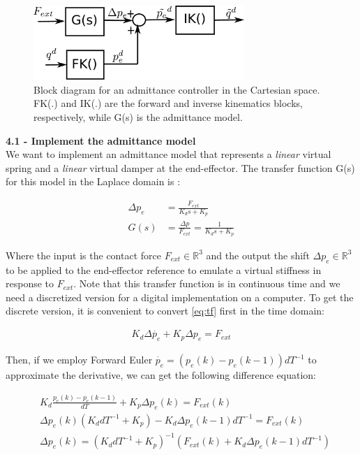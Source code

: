 \documentclass[11pt]{article}
\newcommand{\Rnum}{\mathbb{R}} %
\begin{document}
\begin{figure}[bht]
	\centering
	\includegraphics[width=8cm]{admittanceControl.pdf}
	\caption{Block diagram for an admittance controller in the Cartesian space. FK(.) and IK(.) are the forward and inverse kinematics blocks, respectively, while G(s) is the admittance model.}
	\label{fig:admittance}
\end{figure}

\quad

\noindent
\textbf{4.1 - Implement the admittance model }\\
We want to implement an admittance model that represents a \textit{linear} virtual spring and a \textit{linear} virtual damper at the end-effector.
The transfer function G(s) for this model in the Laplace domain is :



\begin{align}
\label{eq:tf}
\Delta p_e &= \frac{ F_{ext} }{K_d s + K_p}\\
G(s)& = \frac{\Delta p}{F_{ext}} = \frac{ 1 }{K_d s + K_p} \nonumber
\end{align}


Where the input is the contact force $F_{ext}\in \Rnum^3$ and the output the shift  $\Delta p_e\in \Rnum^3$ to be applied to the end-effector reference to emulate a virtual stiffness in response to  $F_{ext}$. Note that this transfer function is in continuous time and we need a discretized version for a digital implementation on a computer. To get the discrete version, it is convenient to convert \eqref{eq:tf} first in the time domain:

\begin{align*}
K_d \Delta\dot{ p_e} + K_p{\Delta p_e}  =  F_{ext}  
\end{align*}
 
Then, if  we  employ Forward Euler $\dot{p_e} = (p_e(k)- p_e(k-1))dT^{-1}$ to approximate the derivative, we can get the following difference equation:

\begin{align*}
&K_d \frac{p_e(k)- p_e(k-1)}{dT}  + K_p \Delta p_e(k)  =  F_{ext}(k)  \\
&\Delta p_e(k) (K_d dT^{-1} + K_p ) - K_d \Delta p_e(k-1)dT^{-1} =  F_{ext}(k)\\
&\Delta p_e(k) =  (K_d dT^{-1} + K_p )^{-1} (F_{ext}(k) + K_d \Delta p_e(k-1)dT^{-1})
\end{align*}
\end{document}
